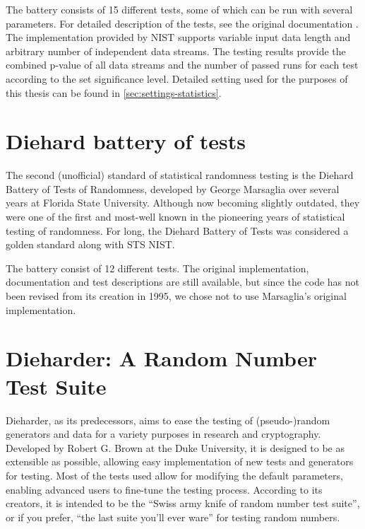 \documentclass[12pt,oneside]{fithesis2}		%
\renewcommand{\_}{\leavevmode \kern0.0em\vbox{\hrule width0.4em}}
\begin{document}
The battery consists of 15 different tests, some of which can be run with several parameters. 
For detailed description of the tests, see the original documentation \parencite{sts-nist-documentation}. 
The implementation provided by NIST supports variable input data length and arbitrary number of independent data streams. 
The testing results provide the combined p-value of all data streams and the number of passed runs for each test 
according to the set significance level. 
Detailed setting used for the purposes of this thesis can be found in \autoref{sec:settings-statistics}.

\section{Diehard battery of tests}
\label{sec:diehard}

The second (unofficial) standard of statistical randomness testing is the Diehard Battery of Tests of Randomness, 
developed by George Marsaglia over several years at Florida State University. \parencite{diehard} 
Although now becoming slightly outdated, they were one of the first and most-well known 
in the pioneering years of statistical testing of randomness. 
For long, the Diehard Battery of Tests was considered a golden standard along with STS NIST.

The battery consist of 12 different tests. The original implementation, documentation and test descriptions are still available,
but since the code has not been revised from its creation in 1995, we chose not to use Marsaglia's original implementation.

\section{Dieharder: A Random Number Test Suite}
\label{sec:dieharder}

Dieharder, as its predecessors, aims to ease the testing of (pseudo-)random generators and data for a variety purposes in research 
and cryptography. Developed by Robert G. Brown at the Duke University, it is designed to be as extensible as possible, 
allowing easy implementation of new tests and generators for testing. Most of the tests used allow for 
modifying the default parameters, enabling advanced users to fine-tune the testing process.
According to its creators, it is intended to be the ``Swiss army knife of random number test suite'', 
or if you prefer, ``the last suite you'll ever ware'' for testing random numbers. \parencite{dieharder}
\end{document}

